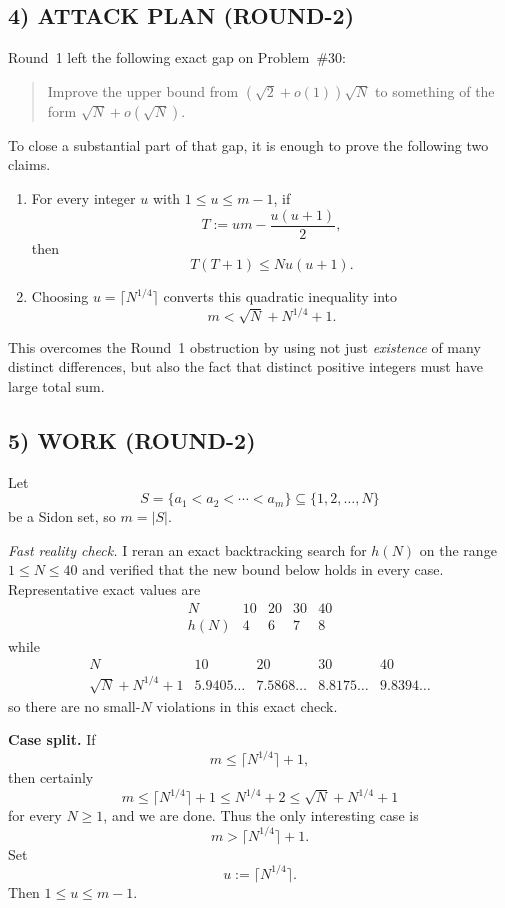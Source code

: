 \subsection*{4) ATTACK PLAN (ROUND-2)}
Round~1 left the following exact gap on Problem~\#30:
\begin{quote}
Improve the upper bound from $(\sqrt{2}+o(1))\sqrt{N}$ to something of the form $\sqrt{N}+o(\sqrt{N})$.
\end{quote}
To close a substantial part of that gap, it is enough to prove the following two claims.
\begin{enumerate}
\item For every integer $u$ with $1\le u\le m-1$, if
\[
T:=um-\frac{u(u+1)}{2},
\]
then
\[
T(T+1)\le Nu(u+1).
\]
\item Choosing $u=\lceil N^{1/4}\rceil$ converts this quadratic inequality into
\[
 m<\sqrt{N}+N^{1/4}+1.
\]
\end{enumerate}
This overcomes the Round~1 obstruction by using not just \emph{existence} of many distinct differences, but also the fact that distinct positive integers must have large total sum.

\subsection*{5) WORK (ROUND-2)}
Let
\[
S=\{a_1<a_2<\cdots<a_m\}\subseteq \{1,2,\dots,N\}
\]
be a Sidon set, so $m=|S|$.

\medskip
\noindent\textit{Fast reality check.}
I reran an exact backtracking search for $h(N)$ on the range $1\le N\le 40$ and verified that the new bound below holds in every case. Representative exact values are
\[
\begin{array}{c|cccc}
N&10&20&30&40\\\hline
h(N)&4&6&7&8
\end{array}
\]
while
\[
\begin{array}{c|cccc}
N&10&20&30&40\\\hline
\sqrt{N}+N^{1/4}+1&5.9405\ldots&7.5868\ldots&8.8175\ldots&9.8394\ldots
\end{array}
\]
so there are no small-$N$ violations in this exact check.

\medskip
\noindent\textbf{Case split.}
If
\[
 m\le \lceil N^{1/4}\rceil+1,
\]
then certainly
\[
 m\le \lceil N^{1/4}\rceil+1\le N^{1/4}+2\le \sqrt{N}+N^{1/4}+1
\]
for every $N\ge 1$, and we are done. Thus the only interesting case is
\[
 m>\lceil N^{1/4}\rceil+1.
\]
Set
\[
 u:=\lceil N^{1/4}\rceil.
\]
Then $1\le u\le m-1$.

